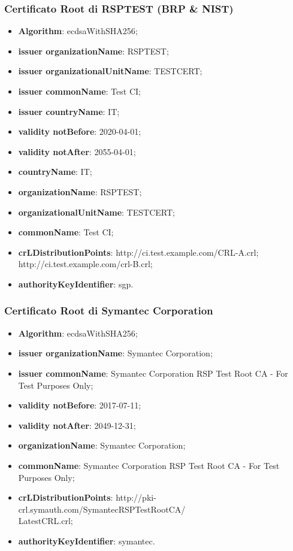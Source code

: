 \documentclass[10pt, oneside]{book}
\begin{document}
\subsubsection{Certificato Root di RSPTEST (BRP \& NIST)}
\begin{itemize}
\item \textbf{Algorithm}: ecdsaWithSHA256;
\item \textbf{issuer organizationName}: RSPTEST;
\item \textbf{issuer organizationalUnitName}: TESTCERT;
\item \textbf{issuer commonName}: Test CI;
\item \textbf{issuer countryName}: IT;
\item \textbf{validity notBefore}: 2020-04-01;
\item \textbf{validity notAfter}: 2055-04-01;
\item \textbf{countryName}: IT;
\item \textbf{organizationName}: RSPTEST;
\item \textbf{organizationalUnitName}: TESTCERT;
\item \textbf{commonName}: Test CI;
\item \textbf{crLDistributionPoints}: http://ci.test.example.com/CRL-A.crl;\\http://ci.test.example.com/crl-B.crl;
\item \textbf{authorityKeyIdentifier}: sgp.
\end{itemize}

\subsubsection{Certificato Root di Symantec Corporation}
\begin{itemize}
\item \textbf{Algorithm}: ecdsaWithSHA256;
\item \textbf{issuer organizationName}: Symantec Corporation;
\item \textbf{issuer commonName}: Symantec Corporation RSP Test Root CA - For Test Purposes Only;
\item \textbf{validity notBefore}: 2017-07-11;
\item \textbf{validity notAfter}: 2049-12-31;
\item \textbf{organizationName}: Symantec Corporation;
\item \textbf{commonName}: Symantec Corporation RSP Test Root CA - For Test Purposes Only;
\item \textbf{crLDistributionPoints}: http://pki-crl.symauth.com/SymantecRSPTestRootCA/\\LatestCRL.crl;
\item \textbf{authorityKeyIdentifier}: symantec.
\end{itemize}
\end{document}
